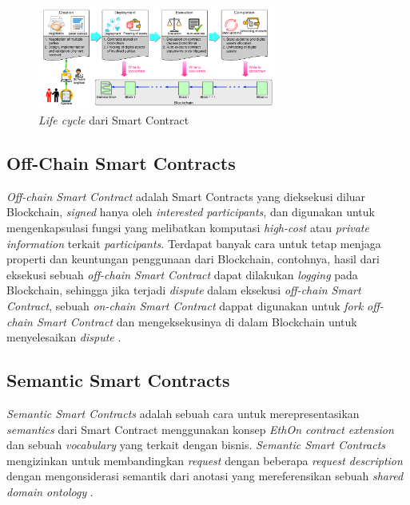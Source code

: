 \begin{figure}
	\centering
	\includegraphics[width=0.7\textwidth]{resources/chapter-2/sc-lifecycle.png}
	\caption{\textit{Life cycle} dari Smart Contract \parencite{zheng2020overview}}
	\label{image:sc-lifecycle}
\end{figure}

\subsection{Off-Chain Smart Contracts}
\label{subsec:off-chain-smart-contracts}

\textit{Off-chain Smart Contract} adalah Smart Contracts yang dieksekusi diluar Blockchain, \textit{signed} hanya oleh \textit{interested participants}, dan digunakan untuk mengenkapsulasi fungsi yang melibatkan komputasi \textit{high-cost} atau \textit{private information} terkait \textit{participants}. Terdapat banyak cara untuk tetap menjaga properti dan keuntungan penggunaan dari Blockchain, contohnya, hasil dari eksekusi sebuah \textit{off-chain Smart Contract} dapat dilakukan \textit{logging} pada Blockchain, sehingga jika terjadi \textit{dispute} dalam eksekusi \textit{off-chain Smart Contract}, sebuah \textit{on-chain Smart Contract} dappat digunakan untuk \textit{fork off-chain Smart Contract} dan mengeksekusinya di dalam Blockchain untuk menyelesaikan \textit{dispute} \parencite{zou2019smart}.

\subsection{Semantic Smart Contracts}
\label{subsec:semantic-smart-contracts}
\textit{Semantic Smart Contracts} adalah sebuah cara untuk merepresentasikan \textit{semantics} dari Smart Contract menggunakan konsep \textit{EthOn contract extension} dan sebuah \textit{vocabulary} yang terkait dengan bisnis. \textit{Semantic Smart Contracts} mengizinkan untuk membandingkan \textit{request} dengan beberapa \textit{request description} dengan mengonsiderasi semantik dari anotasi yang mereferensikan sebuah \textit{shared domain ontology} \parencite{baqa2019semantic}.
